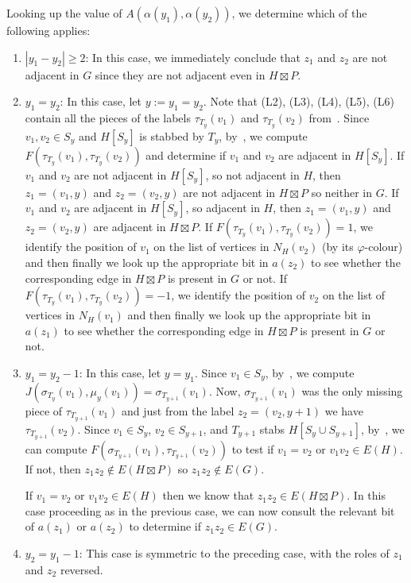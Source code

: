 \documentclass[kpfonts]{patmorin}
\let\ge\geqslant
\begin{document}
Looking up the value of $A(\alpha(y_1),\alpha(y_2))$, we determine which of the following applies:
\begin{enumerate}
  \item $|y_1-y_2|\ge 2$: 
  In this case, we immediately conclude that $z_1$ and $z_2$ are not adjacent in $G$ since they are not adjacent even in $H\boxtimes P$.
  \item $y_1=y_2$:  
  In this case, let $y:=y_1=y_2$. 
  Note that (L2), (L3), (L4), (L5), (L6) contain all the pieces of the labels $\tau_{T_y}(v_1)$ and $\tau_{T_y}(v_2)$ from~. 
  Since $v_1,v_2 \in S_y$ and $H[S_y]$ is stabbed by $T_y$, by~,
  we compute $F(\tau_{T_y}(v_1),\tau_{T_y}(v_2))$ and determine if $v_1$ and $v_2$ are adjacent in $H[S_y]$. 
  If $v_1$ and $v_2$ are not adjacent in $H[S_y]$, so not adjacent in $H$, then $z_1=(v_1,y)$ and $z_2=(v_2,y)$ are not adjacent in $H\boxtimes P$ so neither in $G$.
  If $v_1$ and $v_2$ are adjacent in $H[S_y]$, so adjacent in $H$, then $z_1=(v_1,y)$ and $z_2=(v_2,y)$ are adjacent in $H\boxtimes P$. 
  If $F(\tau_{T_y}(v_1),\tau_{T_y}(v_2))=1$, 
  we identify the position of $v_1$ on the list of vertices in $N_H(v_2)$ (by its $\varphi$-colour) 
  and then finally we look up the appropriate bit in $a(z_2)$ to see whether the corresponding edge in $H\boxtimes P$ is present in $G$ or not.
  If $F(\tau_{T_y}(v_1),\tau_{T_y}(v_2))=-1$, 
  we identify the position of $v_2$ on the list of vertices in $N_H(v_1)$
  and then finally we look up the appropriate bit in $a(z_1)$ to see whether the corresponding edge in $H\boxtimes P$ is present in $G$ or not.
  \item $y_1=y_2-1$: 
  In this case, let $y=y_1$. 
  Since $v_1 \in S_y$, by~,
  we compute $J(\sigma_{T_y}(v_1),\mu_y(v_1))=\sigma_{T_{y+1}}(v_1)$. 
  Now, $\sigma_{T_{y+1}}(v_1)$ was the only missing piece of $\tau_{T_{y+1}}(v_1)$ and 
  just from the label $z_2=(v_2,y+1)$ we have $\tau_{T_{y+1}}(v_2)$. 
  Since $v_1 \in S_y$, $v_2 \in S_{y+1}$, and $T_{y+1}$ stabs $H[S_y \cup S_{y+1}]$, by~, 
  we can compute $F(\sigma_{T_{y+1}}(v_1),\tau_{T_{y+1}}(v_2))$ to test if $v_1=v_2$ or $v_1v_2\in E(H)$. 
  If not, then $z_1z_2\not\in E(H\boxtimes P)$ so $z_1z_2\not\in E(G)$.

  If $v_1=v_2$ or $v_1v_2\in E(H)$ then we know that $z_1z_2\in E(H\boxtimes P)$.  
  In this case proceeding as in the previous case, we can now consult the relevant bit of $a(z_1)$ or $a(z_2)$ to determine if $z_1z_2\in E(G)$.

  \item $y_2=y_1-1$:  This case is symmetric to the preceding case, with the roles of $z_1$ and $z_2$ reversed.
\end{enumerate}
\end{document}
